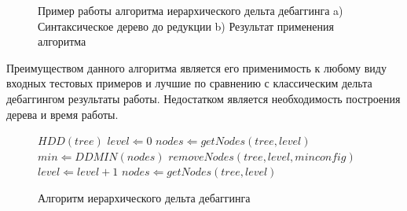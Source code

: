 \begin{figure}[h]
\caption{Пример работы алгоритма иерархического дельта дебаггинга a) Синтаксическое дерево до редукции b) Результат применения алгоритма}
\label{ex:hdd}
\end{figure}

Преимуществом данного алгоритма является его применимость к любому виду входных тестовых примеров и лучшие по сравнению с классическим дельта дебаггингом результаты работы. Недостатком является необходимость построения дерева и время работы.
\begin{figure}[h]
\begin{algorithmic}[1]
\STATE $HDD(tree)$
\STATE $level \Leftarrow 0$
\STATE $nodes \Leftarrow getNodes(tree, level)$
	\STATE $min \Leftarrow DDMIN(nodes)$
	\STATE $removeNodes(tree, level, minconfig)$
	\STATE $level \Leftarrow level + 1$
	\STATE $nodes \Leftarrow getNodes(tree, level)$
\ENDWHILE
\end{algorithmic}
\caption{Алгоритм иерархического дельта дебаггинга}
\label{alg:hdd}
\end{figure}



